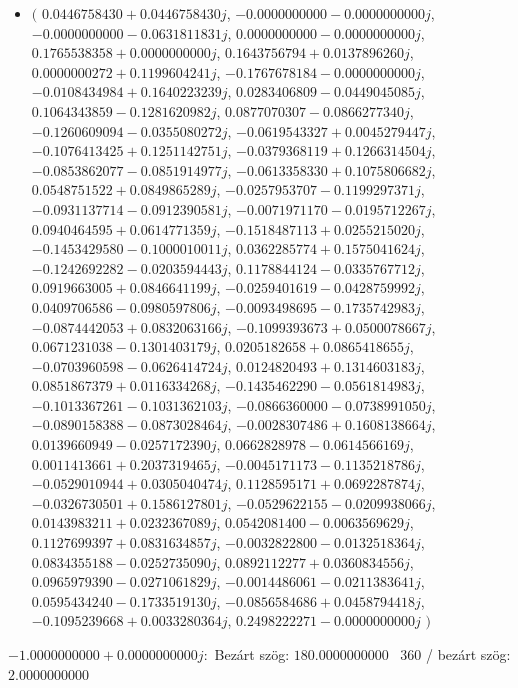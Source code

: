 \documentclass[14pt,a4paper]{article}
\begin{document}
\begin{itemize}
\item
$\big($
$0.0446758430+0.0446758430j$, $-0.0000000000-0.0000000000j$, $-0.0000000000-0.0631811831j$, $0.0000000000-0.0000000000j$, $0.1765538358+0.0000000000j$, $0.1643756794+0.0137896260j$, $0.0000000272+0.1199604241j$, $-0.1767678184-0.0000000000j$, $-0.0108434984+0.1640223239j$, $0.0283406809-0.0449045085j$, $0.1064343859-0.1281620982j$, $0.0877070307-0.0866277340j$, $-0.1260609094-0.0355080272j$, $-0.0619543327+0.0045279447j$, $-0.1076413425+0.1251142751j$, $-0.0379368119+0.1266314504j$, $-0.0853862077-0.0851914977j$, $-0.0613358330+0.1075806682j$, $0.0548751522+0.0849865289j$, $-0.0257953707-0.1199297371j$, $-0.0931137714-0.0912390581j$, $-0.0071971170-0.0195712267j$, $0.0940464595+0.0614771359j$, $-0.1518487113+0.0255215020j$, $-0.1453429580-0.1000010011j$, $0.0362285774+0.1575041624j$, $-0.1242692282-0.0203594443j$, $0.1178844124-0.0335767712j$, $0.0919663005+0.0846641199j$, $-0.0259401619-0.0428759992j$, $0.0409706586-0.0980597806j$, $-0.0093498695-0.1735742983j$, $-0.0874442053+0.0832063166j$, $-0.1099393673+0.0500078667j$, $0.0671231038-0.1301403179j$, $0.0205182658+0.0865418655j$, $-0.0703960598-0.0626414724j$, $0.0124820493+0.1314603183j$, $0.0851867379+0.0116334268j$, $-0.1435462290-0.0561814983j$, $-0.1013367261-0.1031362103j$, $-0.0866360000-0.0738991050j$, $-0.0890158388-0.0873028464j$, $-0.0028307486+0.1608138664j$, $0.0139660949-0.0257172390j$, $0.0662828978-0.0614566169j$, $0.0011413661+0.2037319465j$, $-0.0045171173-0.1135218786j$, $-0.0529010944+0.0305040474j$, $0.1128595171+0.0692287874j$, $-0.0326730501+0.1586127801j$, $-0.0529622155-0.0209938066j$, $0.0143983211+0.0232367089j$, $0.0542081400-0.0063569629j$, $0.1127699397+0.0831634857j$, $-0.0032822800-0.0132518364j$, $0.0834355188-0.0252735090j$, $0.0892112277+0.0360834556j$, $0.0965979390-0.0271061829j$, $-0.0014486061-0.0211383641j$, $0.0595434240-0.1733519130j$, $-0.0856584686+0.0458794418j$, $-0.1095239668+0.0033280364j$, $0.2498222271-0.0000000000j$
$\big)$
\end{itemize}
$-1.0000000000+0.0000000000j$:\
Bezárt szög: $180.0000000000$ \
360 / bezárt szög: $2.0000000000$\
\end{document}
